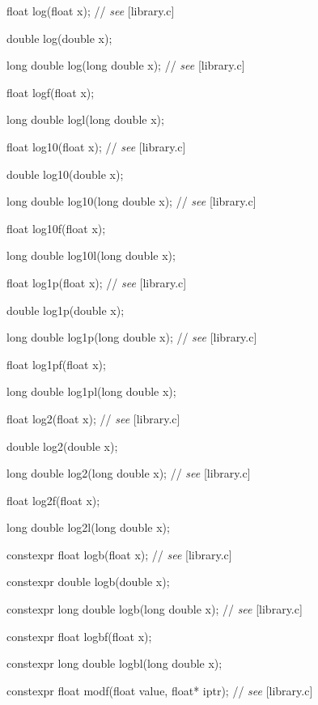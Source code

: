 \documentclass[prd,twocolumn,amsmath,amssymb,nofootinbib,eqsecnum]{revtex4-1}
\newcommand{\highlight}[1]{{\color{green} #1}}
\newcommand{\stdcomment}[1]{{// {\it see} [#1]}}
\begin{document}
{\vspace{2ex}

float log(float x); \stdcomment{library.c}

double log(double x);

long double log(long double x); \stdcomment{library.c}

float logf(float x);

long double logl(long double x);

\vspace{2ex}

float log10(float x); \stdcomment{library.c}

double log10(double x);

long double log10(long double x); \stdcomment{library.c}

float log10f(float x);

long double log10l(long double x);

\vspace{2ex}

float log1p(float x); \stdcomment{library.c}

double log1p(double x);

long double log1p(long double x); \stdcomment{library.c}

float log1pf(float x);

long double log1pl(long double x);

\vspace{2ex}

float log2(float x); \stdcomment{library.c}

double log2(double x);

long double log2(long double x); \stdcomment{library.c}

float log2f(float x);

long double log2l(long double x);

\vspace{2ex}

\highlight{constexpr} float logb(float x); \stdcomment{library.c}

\highlight{constexpr} double logb(double x);

\highlight{constexpr} long double logb(long double x); \stdcomment{library.c}

\highlight{constexpr} float logbf(float x);

\highlight{constexpr} long double logbl(long double x);

\vspace{2ex}

\highlight{constexpr}  float modf(float value, float* iptr); \stdcomment{library.c}

}
\end{document}

